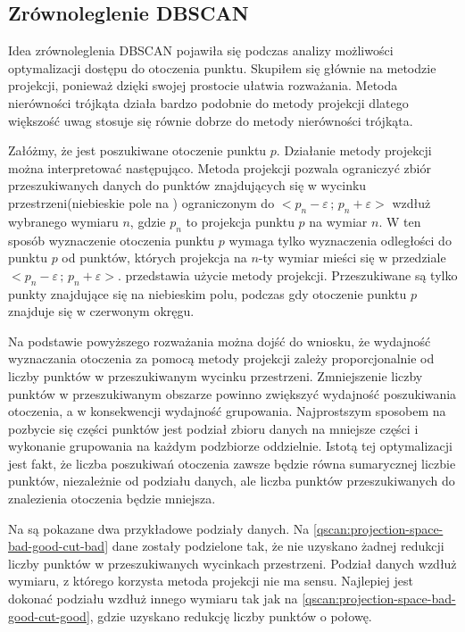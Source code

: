 \subsection*{Zrównoleglenie DBSCAN}
Idea zrównoleglenia DBSCAN pojawiła się podczas analizy możliwości optymalizacji dostępu do otoczenia punktu. Skupiłem się głównie na metodzie projekcji, ponieważ dzięki swojej prostocie ułatwia rozważania. Metoda nierówności trójkąta działa bardzo podobnie do metody projekcji dlatego większość uwag stosuje się równie dobrze do metody nierówności trójkąta.\par
Załóżmy, że jest poszukiwane otoczenie punktu $ p $. Działanie metody projekcji można interpretować następująco. Metoda projekcji pozwala ograniczyć zbiór przeszukiwanych danych do punktów znajdujących się w wycinku przestrzeni(niebieskie pole na ) ograniczonym do $ <p_n-\varepsilon\,;\,p_n+\varepsilon> $ wzdłuż wybranego wymiaru $ n $, gdzie $ p_n $ to projekcja punktu $ p $ na wymiar $ n $. W ten sposób wyznaczenie otoczenia punktu $ p $ wymaga tylko wyznaczenia odległości do punktu $ p $ od punktów, których projekcja na $ n $-ty wymiar mieści się w przedziale $ <p_n-\varepsilon\,;\,p_n+\varepsilon> $.  przedstawia użycie metody projekcji. Przeszukiwane są tylko punkty znajdujące się na niebieskim polu, podczas gdy otoczenie punktu $ p $ znajduje się w czerwonym okręgu.\par

Na podstawie powyższego rozważania można dojść do wniosku, że wydajność wyznaczania otoczenia za pomocą metody projekcji zależy proporcjonalnie od liczby punktów w przeszukiwanym wycinku przestrzeni. Zmniejszenie liczby punktów w przeszukiwanym obszarze powinno zwiększyć wydajność poszukiwania otoczenia, a w konsekwencji wydajność grupowania. Najprostszym sposobem na pozbycie się części punktów jest podział zbioru danych na mniejsze części i wykonanie grupowania na każdym podzbiorze oddzielnie. Istotą tej optymalizacji jest fakt, że liczba poszukiwań otoczenia zawsze będzie równa sumarycznej liczbie punktów, niezależnie od podziału danych, ale liczba punktów przeszukiwanych do znalezienia otoczenia będzie mniejsza.\par

Na  są pokazane dwa przykładowe podziały danych. Na \ref{qscan:projection-space-bad-good-cut-bad} dane zostały podzielone tak, że nie uzyskano żadnej redukcji liczby punktów w przeszukiwanych wycinkach przestrzeni. Podział danych wzdłuż wymiaru, z którego korzysta metoda projekcji nie ma sensu. Najlepiej jest dokonać podziału wzdłuż innego wymiaru tak jak na \ref{qscan:projection-space-bad-good-cut-good}, gdzie uzyskano redukcję liczby punktów o połowę.\par
